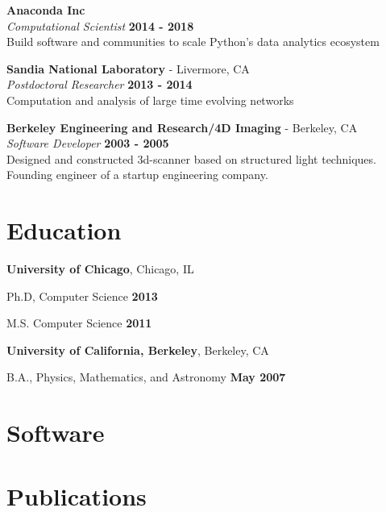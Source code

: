 \documentclass[margin,line]{res}
\newenvironment{list1}{
  \begin{list}{\ding{113}}{%
      \setlength{\itemsep}{0in}
      \setlength{\parsep}{0in} \setlength{\parskip}{0in}
      \setlength{\topsep}{0in} \setlength{\partopsep}{0in}
      \setlength{\leftmargin}{0.17in}}}{\end{list}}
\begin{document}
\begin{resume}
{\bf Anaconda Inc} \\
{\em Computational Scientist} \hfill {\bf 2014 - 2018}\\
Build software and communities to scale Python's data analytics ecosystem

{\bf Sandia National Laboratory } - Livermore, CA\\
{\em Postdoctoral Researcher} \hfill {\bf 2013 - 2014}\\
Computation and analysis of large time evolving networks

{\bf Berkeley Engineering and Research/4D Imaging} - Berkeley, CA\\
{\em Software Developer} \hfill {\bf 2003 - 2005}\\
Designed and constructed 3d-scanner based on structured light techniques.
Founding engineer of a startup engineering company.

\section{\sc Education}
{\bf University of Chicago}, Chicago, IL\\
\vspace*{-.1in}
\begin{list1}
\item[] Ph.D, Computer Science \hfill {\bf 2013}
\item[] M.S. Computer Science \hfill {\bf 2011}
\end{list1}

{\bf University of California, Berkeley}, Berkeley, CA\\
\vspace*{-.1in}
\begin{list1}
\item[] B.A., Physics, Mathematics, and Astronomy \hfill {\bf May 2007}
\end{list1}

\section{\sc Software}




\section{\sc Publications}




\end{resume}
\end{document}
